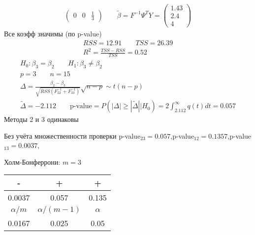 \documentclass{article}
\begin{document}
\begin{eg}
\begin{gather*}
\begin{pmatrix}
      0 & 0 & \frac{1}{3}
    \end{pmatrix} \qquad \tilde{\beta}=F^{-1}\Psi^{T}Y = \begin{pmatrix}
      1.43 \\ 2.4 \\ 4
    \end{pmatrix}
  \end{gather*}
  Все коэфф значимы (по p-value)
  \begin{gather*}
    RSS=12.91 \qquad TSS=26.39  \\ 
    R^{2}=\frac{TSS-RSS}{TSS}=0.52
  \end{gather*}
  \begin{gather*}
    H_0: \beta_3 = \beta_2 \qquad H_1: \beta_3\neq \beta_2 \\ 
    p = 3 \qquad n = 15\\
    \Delta = \frac{\beta_2-\beta_3}{\sqrt{RSS(F^{-1}_{22}+F^{-1}_{33})}} \sqrt{n-p} \sim t(n-p) \\ 
    \tilde{\Delta} = -2.112 \qquad \text{p-value} = P(|\Delta| \ge |\tilde{\Delta}|\Big| H_0) = 2\int_{2.112}^{\infty}q(t)dt =0.057
  \end{gather*}
  Методы 2 и 3 одинаковы

Без учёта множественности проверки p-value$_{23}=0.057$,p-value$_{12}=0.1357$,p-value$_{13}=0.0 037$,

Холм-Бонферрони: $m=3$
  \begin{center}
  \begin{tabular}{|c|c|c|}
    \hline
    - & + & + \\ 
    \hline
    0.0037 & 0.057 & 0.135 \\ 
    \hline
    $\alpha/m$ & $\alpha/(m-1)$ & $\alpha$ \\ 
    \hline
    0.0167 & 0.025 & 0.05 \\
    \hline
  \end{tabular}
  \end{center}
\end{eg}
\end{document}

